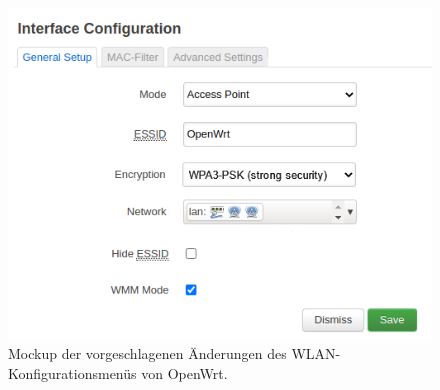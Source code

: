 \documentclass[a4paper]{book}
\begin{document}
\begin{large}
\begin{onehalfspace}
\begin{figure}[ht]
\begin{center}
\includegraphics[scale=0.5]{images/mockup} 
\caption{Mockup der vorgeschlagenen Änderungen des WLAN-Konfigurationsmenüs von OpenWrt.}
\label{fig:Mockup}
\end{center}
\end{figure}	 	
 	

\end{onehalfspace}
\end{large}
\end{document}
